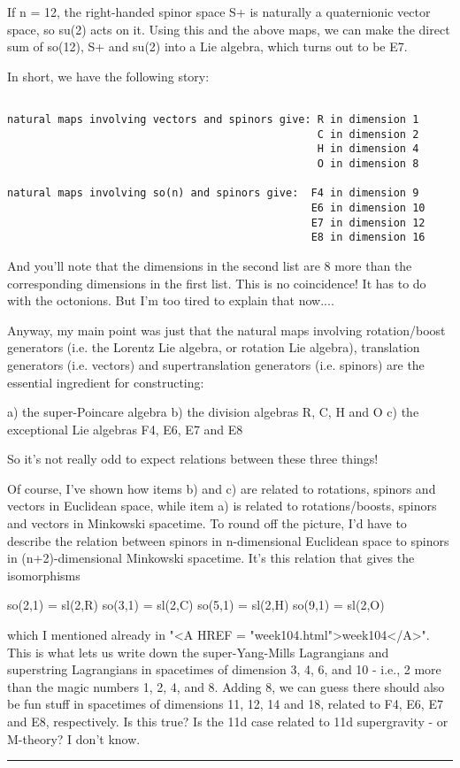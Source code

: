 If n = 12, the right-handed spinor space S+ is naturally a quaternionic
vector space, so su(2) acts on it.  Using this and the above maps, we
can make the direct sum of so(12), S+ and su(2) into a Lie algebra, which
turns out to be E7.

In short, we have the following story:


\begin{verbatim}

natural maps involving vectors and spinors give: R in dimension 1
                                                 C in dimension 2
                                                 H in dimension 4
                                                 O in dimension 8

natural maps involving so(n) and spinors give:  F4 in dimension 9
                                                E6 in dimension 10
                                                E7 in dimension 12
                                                E8 in dimension 16
\end{verbatim}
    
And you'll note that the dimensions in the second list are 8 more than
the corresponding dimensions in the first list.  This is no coincidence!
It has to do with the octonions.  But I'm too tired to explain that now....

Anyway, my main point was just that the natural maps involving 
rotation/boost generators (i.e. the Lorentz Lie algebra, or rotation Lie
algebra), translation generators (i.e. vectors) and supertranslation
generators (i.e. spinors) are the essential ingredient for constructing:

a) the super-Poincare algebra
b) the division algebras R, C, H and O
c) the exceptional Lie algebras F4, E6, E7 and E8

So it's not really odd to expect relations between these three things!

Of course, I've shown how items b) and c) are related to rotations,
spinors and vectors in Euclidean space, while item a) is related to
rotations/boosts, spinors and vectors in Minkowski spacetime.  To round
off the picture, I'd have to describe the relation between spinors in 
n-dimensional Euclidean space to spinors in (n+2)-dimensional Minkowski
spacetime.  It's this relation that gives the isomorphisms

so(2,1) = sl(2,R)
so(3,1) = sl(2,C)
so(5,1) = sl(2,H)
so(9,1) = sl(2,O)

which I mentioned already in "<A HREF =
"week104.html">week104</A>".  This is what lets us write down the
super-Yang-Mills Lagrangians and superstring Lagrangians in spacetimes
of dimension 3, 4, 6, and 10 - i.e., 2 more than the magic numbers 1, 2,
4, and 8.  Adding 8, we can guess there should also be fun stuff in
spacetimes of dimensions 11, 12, 14 and 18, related to F4, E6, E7 and
E8, respectively.  Is this true?  Is the 11d case related to 11d
supergravity - or M-theory?  I don't know.





 \par\noindent\rule{\textwidth}{0.4pt}

